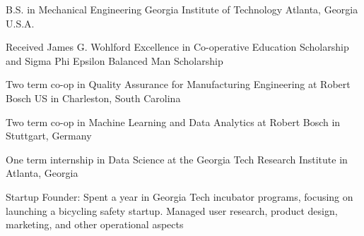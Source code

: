 

\begin{cventries}

  \cventry
    {B.S. in Mechanical Engineering} %
    {Georgia Institute of Technology} %
    {} %
    {Atlanta, Georgia U.S.A.} %
    {
      \begin{cvitems} %
        \item {Received James G. Wohlford Excellence in Co-operative Education Scholarship and Sigma Phi Epsilon Balanced Man Scholarship}
        \item {Two term co-op in Quality Assurance for Manufacturing Engineering at Robert Bosch US in Charleston, South Carolina}
        \item {Two term co-op in Machine Learning and Data Analytics at Robert Bosch in Stuttgart, Germany}
        \item {One term internship in Data Science at the Georgia Tech Research Institute in Atlanta, Georgia}
        \item {Startup Founder: Spent a year in Georgia Tech incubator programs, focusing on launching a bicycling safety startup. Managed user research, product design, marketing, and other operational aspects}
      \end{cvitems}
    }

\end{cventries}
